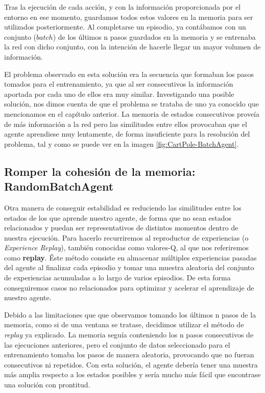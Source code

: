 Tras la ejecución de cada acción, y con la información proporcionada por el entorno en ese momento, guardamos todos estos valores en la memoria para ser utilizados posteriormente. Al completarse un episodio, ya contábamos con un conjunto ($batch$) de los últimos n pasos guardados en la memoria y se entrenaba la red con dicho conjunto, con la intención de hacerle llegar un mayor volumen de información.

El problema observado en esta solución era la secuencia que formaban los pasos tomados para el entrenamiento, ya que al ser consecutivos la información aportada por cada uno de ellos era muy similar. Investigando una posible solución, nos dimos cuenta de que el problema se trataba de uno ya conocido que mencionamos en el capítulo anterior. La memoria de estados consecutivos proveía de más información a la red pero las similitudes entre ellos provocaban que el agente aprendiese muy lentamente, de forma insuficiente para la resolución del problema, tal y como se puede ver en la imagen \ref{fig:CartPole-BatchAgent}.


\subsection{Romper la cohesión de la memoria: RandomBatchAgent}

Otra manera de conseguir estabilidad es reduciendo las similitudes entre los estados de los que aprende nuestro agente, de forma que no sean estados relacionados y puedan ser representativos de distintos momentos dentro de nuestra ejecución. Para hacerlo recurriremos al reproductor de experiencias (o \textit{Experience Replay}), también conocidas como valores-Q, al que nos referiremos como \textbf{replay}. Éste método consiste en almacenar múltiples experiencias pasadas del agente al finalizar cada episodio y tomar una muestra aleatoria del conjunto de experiencias acumuladas a lo largo de varios episodios. De esta forma conseguiremos casos no relacionados para optimizar y acelerar el aprendizaje de nuestro agente.

Debido a las limitaciones que que observamos tomando los últimos n pasos de la memoria, como si de una ventana se tratase, decidimos utilizar el método de \textit{replay} ya explicado. La memoria seguía conteniendo los n pasos consecutivos de las ejecuciones anteriores, pero el conjunto de datos seleccionado para el entrenamiento tomaba los pasos de manera aleatoria, provocando que no fueran consecutivos ni repetidos. Con esta solución, el agente debería tener una muestra más amplia respecto a los estados posibles y sería mucho más fácil que encontrase una solución con prontitud.

